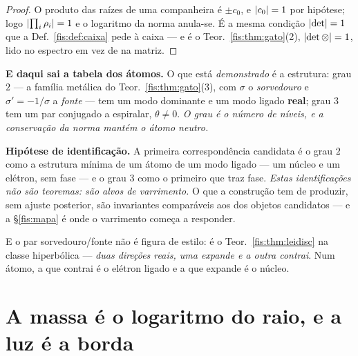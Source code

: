 \documentclass[livro.tex]{subfiles}
\begin{document}
\begin{proof}
O produto das raízes de uma companheira é $\pm c_0$, e $\lvert c_0\rvert=1$ por
hipótese; logo $\lvert \prod_i\rho_i\rvert=1$ e o logaritmo da norma anula-se. É a mesma
condição $\lvert \det\rvert=1$ que a Def.~\ref{fis:def:caixa} pede à caixa --- e é o
Teor.~\ref{fis:thm:gato}(2), $\lvert \det\otimes\rvert=1$, lido no espectro em vez de na
matriz.
\end{proof}

\medskip\noindent\textbf{E daqui sai a tabela dos átomos.} O que está
\emph{demonstrado} é a estrutura: grau $2$ --- a família metálica do
Teor.~\ref{fis:thm:gato}(3), com $\sigma$ o \emph{sorvedouro} e
$\sigma'=-1/\sigma$ a \emph{fonte} --- tem um modo dominante e um modo ligado
\textbf{real}; grau $3$ tem um par conjugado a espiralar, $\theta\neq0$.
\emph{O grau é o número de níveis, e a conservação da norma mantém o átomo
neutro.}

\medskip\noindent\textbf{Hipótese de identificação.} A primeira correspondência
candidata é o grau $2$ como a estrutura mínima de um átomo de um modo ligado ---
um núcleo e um elétron, sem fase --- e o grau $3$ como o primeiro que traz fase.
\emph{Estas identificações não são teoremas: são alvos de varrimento.} O que a
construção tem de produzir, sem ajuste posterior, são invariantes comparáveis aos
dos objetos candidatos --- e a §\ref{fis:mapa} é onde o varrimento começa a
responder.

\medskip\noindent E o par sorvedouro/fonte não é figura de estilo: é o
Teor.~\ref{fis:thm:leidisc} na classe hiperbólica --- \emph{duas direções reais,
uma expande e a outra contrai}. Num átomo, a que contrai é o elétron ligado e a
que expande é o núcleo.


\section{A massa é o logaritmo do raio, e a luz é a borda}\label{fis:massa}
\end{document}
